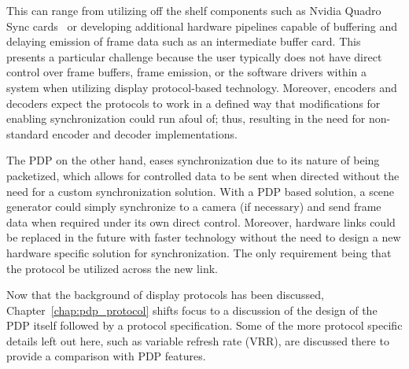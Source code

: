     This can range from utilizing off the shelf components such as Nvidia Quadro Sync cards~\cite{NVIDIA2020_2} or developing additional hardware pipelines capable of buffering and delaying emission of frame data such as an intermediate buffer card. This presents a particular challenge because the user typically does not have direct control over frame buffers, frame emission, or the software drivers within a system when utilizing display protocol-based technology. Moreover, encoders and decoders expect the protocols to work in a defined way that modifications for enabling synchronization could run afoul of; thus, resulting in the need for non-standard encoder and decoder implementations.

    The PDP on the other hand, eases synchronization due to its nature of being packetized, which allows for controlled data to be sent when directed without the need for a custom synchronization solution. With a PDP based solution, a scene generator could simply synchronize to a camera (if necessary) and send frame data when required under its own direct control. Moreover, hardware links could be replaced in the future with faster technology without the need to design a new hardware specific solution for synchronization. The only requirement being that the protocol be utilized across the new link.

    Now that the background of display protocols has been discussed, Chapter~\ref{chap:pdp_protocol} shifts focus to a discussion of the design of the PDP itself followed by a protocol specification. Some of the more protocol specific details left out here, such as variable refresh rate (VRR), are discussed there to provide a comparison with PDP features.
